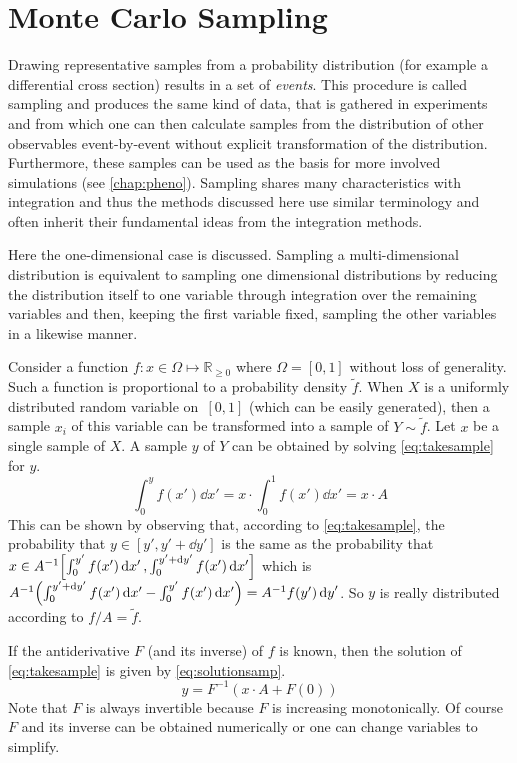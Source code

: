 \section{Monte Carlo Sampling}%
\label{sec:mcsamp}

Drawing representative samples from a probability distribution (for
example a differential cross section) results in a set of
\emph{events}. This procedure is called sampling and produces the same
kind of data, that is gathered in experiments and from which one can
then calculate samples from the distribution of other observables
event-by-event without explicit transformation of the
distribution. Furthermore, these samples can be used as the basis for
more involved simulations (see \cref{chap:pheno}). Sampling shares
many characteristics with integration and thus the methods discussed
here use similar terminology and often inherit their fundamental ideas
from the integration methods.

Here the one-dimensional case is discussed.  Sampling a
multi-dimensional distribution is equivalent to sampling one
dimensional distributions by reducing the distribution itself to one
variable through integration over the remaining variables and then,
keeping the first variable fixed, sampling the other variables in a
likewise manner.

Consider a function \(f\colon x\in\Omega\mapsto\mathbb{R}_{\geq 0}\)
where \(\Omega = [0, 1]\) without loss of generality. Such a function
is proportional to a probability density \(\tilde{f}\). When \(X\) is
a uniformly distributed random variable on~\([0, 1]\) (which can be
easily generated), then a sample \({x_i}\) of this variable can be
transformed into a sample of \(Y\sim\tilde{f}\). Let \(x\) be a single
sample of \(X\). A sample \(y\) of \(Y\) can be obtained by
solving \cref{eq:takesample} for \(y\).
%
\begin{equation}
  \label{eq:takesample}
  \int_{0}^{y}f(x')\dd{x'} = x\cdot\int_0^1f(x')\dd{x'} = x\cdot A
\end{equation}
%
This can be shown by observing that, according
to \cref{eq:takesample}, the probability that
\(y\in[y', y'+\dd{y}']\) is the same as the probability that
\(x\in A^{-1}\qty[\int_{0}^{y'}f(x')\dd{x'},
\int_{0}^{y'+\dd{y}'}f(x')\dd{x'}]\) which is
\(A^{-1}\qty(\int_{0}^{y'+\dd{y}'}f(x')\dd{x'} -
\int_{0}^{y'}f(x')\dd{x'}) = A^{-1} f(y')\dd{y}'\). So \(y\) is really
distributed according to \(f/A=\tilde{f}\).

If the antiderivative \(F\) (and its inverse) of \(f\) is known, then
the solution of \cref{eq:takesample} is given by
\cref{eq:solutionsamp}.
%
\begin{equation}
  \label{eq:solutionsamp}
  y = F^{-1}(x\cdot A + F(0))
\end{equation}
%
Note that \(F\) is always invertible because \(F\) is
increasing monotonically. Of course \(F\) and its inverse can be
obtained numerically or one can change variables to simplify.

